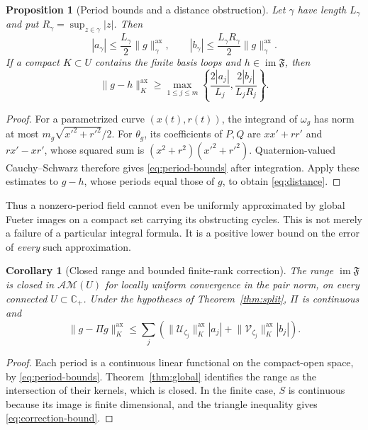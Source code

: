 \documentclass[11pt,a4paper]{article}
\numberwithin{equation}{section}
\newtheorem{proposition}[theorem]{Proposition}
\newtheorem{corollary}[theorem]{Corollary}
\theoremstyle{definition}
\theoremstyle{remark}
\newcommand{\C}{\mathbb C}
\newcommand{\Cp}{\C_+}
\newcommand{\Fu}{\mathfrak F}
\newcommand{\AM}{\mathcal{AM}}
\newcommand{\im}{\operatorname{im}}
\newcommand{\Uker}{\mathcal U}
\newcommand{\Vker}{\mathcal V}
\newcommand{\pairnorm}[1]{\lVert #1\rVert^{\mathrm{ax}}}
\begin{document}
\begin{proposition}[Period bounds and a distance obstruction]
\label{prop:bounds}
Let $\gamma$ have length $L_\gamma$ and put
$R_\gamma=\sup_{z\in\gamma}|z|$. Then
\begin{equation}\label{eq:period-bounds}
 |a_\gamma|\le\frac{L_\gamma}{2}\pairnorm g_\gamma,
 \qquad
 |b_\gamma|\le\frac{L_\gamma R_\gamma}{2}\pairnorm g_\gamma.
\end{equation}
If a compact $K\subset U$ contains the finite basis loops and
$h\in\im\Fu$, then
\begin{equation}\label{eq:distance}
 \pairnorm{g-h}_K\ge
 \max_{1\le j\le m}
 \left\{\frac{2|a_j|}{L_j},\frac{2|b_j|}{L_jR_j}\right\}.
\end{equation}
\end{proposition}
\begin{proof}
For a parametrized curve $(x(t),r(t))$, the integrand of $\omega_g$ has
norm at most $m_g\sqrt{x'^2+r'^2}/2$. For $\theta_g$, its coefficients
of $P,Q$ are $xx'+rr'$ and $rx'-xr'$, whose squared sum is
$(x^2+r^2)(x'^2+r'^2)$. Quaternion-valued Cauchy--Schwarz therefore gives
\eqref{eq:period-bounds} after integration. Apply these estimates to
$g-h$, whose periods equal those of $g$, to obtain \eqref{eq:distance}.
\end{proof}

Thus a nonzero-period field cannot even be uniformly approximated by
global Fueter images on a compact set carrying its obstructing cycles.
This is not merely a failure of a particular integral formula. It is a
positive lower bound on the error of \emph{every} such approximation.

\begin{corollary}[Closed range and bounded finite-rank correction]
\label{cor:closed}
The range $\im\Fu$ is closed in $\AM(U)$ for locally uniform convergence
in the pair norm, on every connected $U\subset\Cp$. Under the hypotheses
of Theorem~\ref{thm:split}, $\Pi$ is continuous and
\begin{equation}\label{eq:correction-bound}
 \pairnorm{g-\Pi g}_K\le\sum_j
 \left(\pairnorm{\Uker_{\zeta_j}}_K|a_j|
       +\pairnorm{\Vker_{\zeta_j}}_K|b_j|\right).
\end{equation}
\end{corollary}
\begin{proof}
Each period is a continuous linear functional on the compact-open space,
by \eqref{eq:period-bounds}. Theorem~\ref{thm:global} identifies the range
as the intersection of their kernels, which is closed. In the finite
case, $S$ is continuous because its image is finite dimensional, and the
triangle inequality gives \eqref{eq:correction-bound}.
\end{proof}
\end{document}

